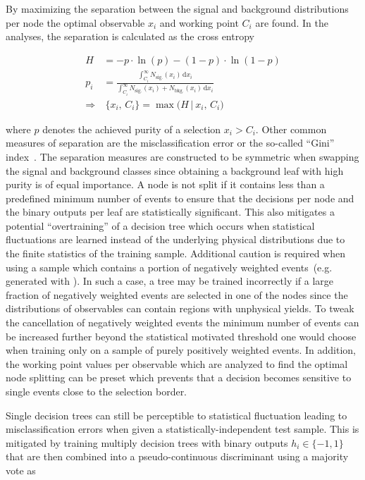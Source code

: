 By maximizing the separation between the signal and background distributions per node the optimal observable $x_{i}$ and working point $C_{i}$  are found. In the analyses, the separation is calculated as the cross entropy 

\begin{align}
H&=-p\cdot\ln(p)-(1-p)\cdot\ln(1-p)\\ p_{i}&=\frac{\int_{C_{i}}^{\infty} N_\mathrm{sig.}(x_{i})\,\mathrm{d}x_{i}}{\int_{C_{i}}^{\infty} N_\mathrm{sig.}(x_{i})+N_\mathrm{bkg.}(x_{i})\,\mathrm{d}x_{i}}\\
\Rightarrow &~\{x_{i},\,C_{i}\}=\max\Big(H\,\big|~x_{i},\,C_{i}\Big)
\end{align}

where $p$ denotes the achieved purity of a selection $x_{i}>C_{i}$. Other common measures of separation are the misclassification error or the so-called ``Gini'' index~\cite{Gini}. The separation measures are constructed to be symmetric when swapping the signal and background classes since obtaining a background leaf with high purity is of equal importance. A node is not split if it contains less than a predefined minimum number of events to ensure that the decisions per node and the binary outputs per leaf are statistically significant. This also mitigates a potential ``overtraining'' of a decision tree which occurs when statistical fluctuations are learned instead of the underlying physical distributions due to the finite statistics of the training sample. Additional caution is required when using a sample which contains a portion of negatively weighted events~(e.g. generated with \MGAMC). In such a case, a tree may be trained incorrectly if a large fraction of negatively weighted events are selected in one of the nodes since the distributions of observables can contain regions with unphysical yields. To tweak the cancellation of negatively weighted events the minimum number of events can be increased further beyond the statistical motivated threshold one would choose when training only on a sample of purely positively weighted events. In addition, the working point values per observable which are analyzed to find the optimal node splitting can be preset which prevents that a decision becomes sensitive to single events close to the selection border.

Single decision trees can still be perceptible to statistical fluctuation leading to misclassification errors when given a statistically-independent test sample. This is mitigated by training multiply decision trees with binary outputs $h_{i}\in\{-1,1\}$ that are then combined into a pseudo-continuous discriminant using a majority vote as

